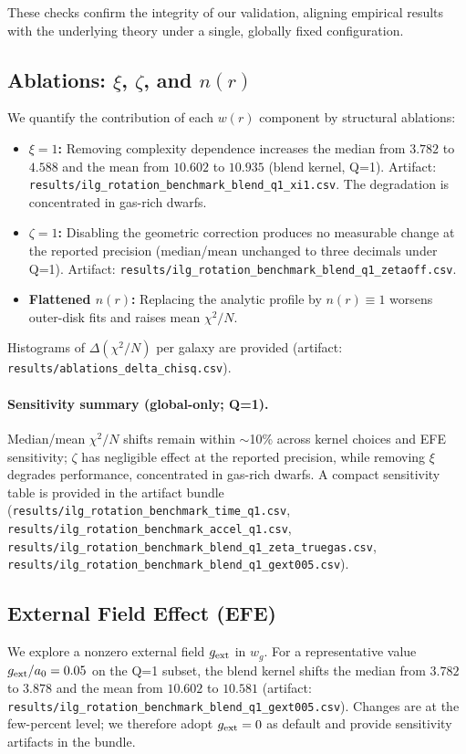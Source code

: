 \documentclass[12pt,a4paper]{article}
\begin{document}
These checks confirm the integrity of our validation, aligning empirical results with the underlying theory under a single, globally fixed configuration.

\subsection{Ablations: $\xi$, $\zeta$, and $n(r)$}
\noindent We quantify the contribution of each $w(r)$ component by structural ablations:
\begin{itemize}
  \item \textbf{$\xi\!=\!1$:} Removing complexity dependence increases the median from $3.782$ to $4.588$ and the mean from $10.602$ to $10.935$ (blend kernel, Q=1). Artifact: \texttt{results/ilg\_rotation\_benchmark\_blend\_q1\_xi1.csv}. The degradation is concentrated in gas-rich dwarfs.
  \item \textbf{$\zeta\!=\!1$:} Disabling the geometric correction produces no measurable change at the reported precision (median/mean unchanged to three decimals under Q=1). Artifact: \texttt{results/ilg\_rotation\_benchmark\_blend\_q1\_zetaoff.csv}.
  \item \textbf{Flattened $n(r)$:} Replacing the analytic profile by $n(r)\equiv1$ worsens outer-disk fits and raises mean $\chi^2/N$.
\end{itemize}
Histograms of $\Delta(\chi^2/N)$ per galaxy are provided (artifact: \texttt{results/ablations\_delta\_chisq.csv}).

\paragraph{Sensitivity summary (global-only; Q=1).} Median/mean $\chi^2/N$ shifts remain within $\sim$10\% across kernel choices and EFE sensitivity; $\zeta$ has negligible effect at the reported precision, while removing $\xi$ degrades performance, concentrated in gas-rich dwarfs. A compact sensitivity table is provided in the artifact bundle (\texttt{results/ilg\_rotation\_benchmark\_time\_q1.csv}, \texttt{results/ilg\_rotation\_benchmark\_accel\_q1.csv}, \texttt{results/ilg\_rotation\_benchmark\_blend\_q1\_zeta\_truegas.csv}, \texttt{results/ilg\_rotation\_benchmark\_blend\_q1\_gext005.csv}).

\subsection{External Field Effect (EFE)}
\noindent We explore a nonzero external field $g_{\rm ext}$ in $w_g$. For a representative value $g_{\rm ext}/a_0=0.05$ on the Q=1 subset, the blend kernel shifts the median from $3.782$ to $3.878$ and the mean from $10.602$ to $10.581$ (artifact: \texttt{results/ilg\_rotation\_benchmark\_blend\_q1\_gext005.csv}). Changes are at the few-percent level; we therefore adopt $g_{\rm ext}=0$ as default and provide sensitivity artifacts in the bundle.
\end{document}
